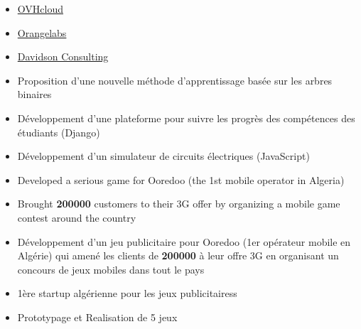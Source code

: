 \documentclass[10pt,a4paper,ragged2e,withhyper]{altacv}
\begin{document}
\begin{paracol}{2}
  \begin{itemize}
    \item \href{https://www.ovhcloud.com}{OVHcloud}
    \item \href{https://lelab.orange.fr}{Orangelabs}
    \item \href{https://www.davidson.group}{Davidson Consulting}
  \end{itemize}
  \divider
  \begin{itemize}
    \item  Proposition  d'une nouvelle méthode d'apprentissage basée sur les arbres binaires
    \item Développement d'une plateforme pour suivre les progrès des compétences des étudiants (Django)
    \item Développement d'un simulateur de circuits électriques (JavaScript)
  \end{itemize}
  \divider
  \newpage
  \medskip
  \begin{itemize}
    \item Developed a serious game for Ooredoo (the 1st mobile operator in Algeria)
    \item Brought \textbf{200000} customers to their 3G offer by organizing a mobile game contest around the country

    \item Développement d'un jeu publicitaire pour Ooredoo (1er opérateur mobile en Algérie) qui amené les clients de \textbf{200000} à leur offre 3G en organisant un concours de jeux mobiles dans tout le pays
  \end{itemize}



  \begin{itemize}

    \item 1ère startup algérienne pour les jeux publicitairess
    \item Prototypage et Realisation de 5 jeux %
  \end{itemize}



\end{paracol}
\end{document}
